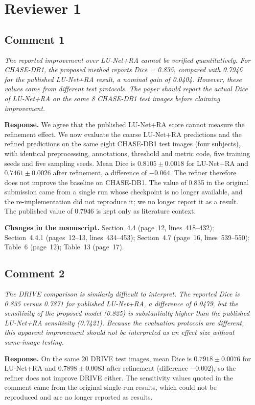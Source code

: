 \documentclass[11pt,a4paper]{article}
\newenvironment{revcomment}{\par\medskip\noindent\begin{minipage}{\linewidth}\itshape}{\end{minipage}\par\smallskip}
\begin{document}
\section*{Reviewer 1}
\subsection*{Comment 1}
\begin{revcomment}The reported improvement over LU-Net+RA cannot be verified quantitatively. For CHASE-DB1, the proposed method reports Dice = 0.835, compared with 0.7946 for the published LU-Net+RA result, a nominal gain of 0.0404. However, these values come from different test protocols. The paper should report the actual Dice of LU-Net+RA on the same 8 CHASE-DB1 test images before claiming improvement.\end{revcomment}
\textbf{Response.} We agree that the published LU-Net+RA score cannot measure the refinement effect. We now evaluate the coarse LU-Net+RA predictions and the refined predictions on the same eight CHASE-DB1 test images (four subjects), with identical preprocessing, annotations, threshold and metric code, five training seeds and five sampling seeds. Mean Dice is $0.8105\pm0.0018$ for LU-Net+RA and $0.7461\pm0.0026$ after refinement, a difference of $-0.064$. The refiner therefore does not improve the baseline on CHASE-DB1. The value of 0.835 in the original submission came from a single run whose checkpoint is no longer available, and the re-implementation did not reproduce it; we no longer report it as a result. The published value of 0.7946 is kept only as literature context.

\textbf{Changes in the manuscript.} Section~4.4 (page~12, lines~418--432); Section~4.4.1 (pages~12--13, lines~434--453); Section~4.7 (page~16, lines~539--550); Table~6 (page~12); Table~13 (page~17).

\subsection*{Comment 2}
\begin{revcomment}The DRIVE comparison is similarly difficult to interpret. The reported Dice is 0.835 versus 0.7871 for published LU-Net+RA, a difference of 0.0479, but the sensitivity of the proposed model (0.825) is substantially higher than the published LU-Net+RA sensitivity (0.7421). Because the evaluation protocols are different, this apparent improvement should not be interpreted as an effect size without same-image testing.\end{revcomment}
\textbf{Response.} On the same 20 DRIVE test images, mean Dice is $0.7918\pm0.0076$ for LU-Net+RA and $0.7898\pm0.0083$ after refinement (difference $-0.002$), so the refiner does not improve DRIVE either. The sensitivity values quoted in the comment came from the original single-run results, which could not be reproduced and are no longer reported as results.
\end{document}
